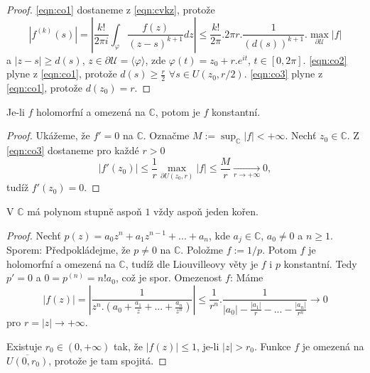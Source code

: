 \begin{proof}
\cref{eqn:co1} dostaneme z \cref{eqn:cvkz}, protože 
\[|f^{(k)}(s)|=
\left\lvert\frac{k!}{2\pi{i}}\int_\varphi{\frac{f(z)}{(z-s)^{k+1}}}dz\right\lvert\leq
\frac{k!}{2\pi}.2\pi{r}.\frac{1}{(d(s))^{k+1}}.\max_{\partial\mathcal{U}}{|f|}\]
a $|z-s|\geq d(s)$, $z\in\partial\mathcal{U}=\langle\varphi\rangle$, zde $\varphi(t)=z_0+r.e^{it}$, $t\in\left[0,2\pi\right]$.\newline
\cref{eqn:co2} plyne z \cref{eqn:co1}, protože $d(s)\geq\frac{r}{2}$ $\forall{s\in{U(z_0,r/2)}}$.\newline
\cref{eqn:co3} plyne z \cref{eqn:co1}, protože $d(z_0)=r$. 
\end{proof}


\begin{theorem}[Liouville]
Je-li $f$ holomorfní  a omezená na $\mathbb{C}$, potom je $f$ konstantní.
\end{theorem}

\begin{proof}
Ukážeme, že $f'=0$ na $\mathbb{C}$. Označme $M:=\sup_\mathbb{C}{|f|}<+\infty$. Nechť $z_0\in\mathbb{C}$. Z \cref{eqn:co3} dostaneme pro každé $r>0$
\[|f'(z_0)|\leq
\frac{1}{r}\max_{\partial{U(z_0,r)}}{|f|}\leq
\frac{M}{r}\underset{{r\to{+\infty}}}{\to}0,\]
tudíž $f'(z_0)=0$.
\end{proof}

\begin{consequence}
V $\mathbb{C}$ má polynom stupně aspoň $1$ vždy aspoň jeden kořen.
\end{consequence}

\begin{proof}
Nechť $p(z)={a_0}{z^n}+{a_1}{z^{n-1}}+...+{a_n}$, kde $a_j\in\mathbb{C}$, $a_0\neq{0}$ a $n\geq{1}$.\newline
Sporem: Předpokládejme, že $p\neq{0}$ na $\mathbb{C}$. Položme $f:=1/p$. Potom $f$ je holomorfní a omezená na $\mathbb{C}$, tudíž dle Liouvilleovy věty je $f$ i $p$ konstantní. Tedy $p'=0$ a $0=p^{(n)}=n!{a_0}$, což je spor.\newline
Omezenost $f$: Máme
\[|f(z)|=\left\lvert\frac{1}{z^n.\left(a_0+\frac{a_1}{z}+...+\frac{a_n}{z^n}\right)}\right\lvert\leq
\frac{1}{r^n}.\frac{1}{|a_0|-\frac{|a_1|}{r}-...-\frac{|a_n|}{r^n}}\longrightarrow 0\]
pro $r=|z|\to+\infty$.

Existuje $r_0\in(0,+\infty)$ tak, že $|f(z)|\leq{1}$, je-li $|z|>r_0$. Funkce $f$ je omezená na $\overline{U(0,r_0)}$, protože je tam spojitá.
\end{proof}

